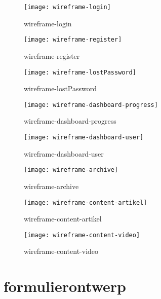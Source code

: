\documentclass[]{report}
\begin{document}
\begin{figure}
	\centering
	\texttt{[image: wireframe-login]}
	\caption{wireframe-login}
	\label{fig:wireframe-login}
\end{figure}


\begin{figure}
	\centering
	\texttt{[image: wireframe-register]}
	\caption{wireframe-register}
	\label{fig:wireframe-register}
\end{figure}

\begin{figure}
	\centering
	\texttt{[image: wireframe-lostPassword]}
	\caption{wireframe-lostPassword}
	\label{fig:wireframe-lostPassword}
\end{figure}


\begin{figure}
	\centering
	\texttt{[image: wireframe-dashboard-progress]}
	\caption{wireframe-dashboard-progress}
	\label{fig:wireframe-dashboard-progress}
\end{figure}

\begin{figure}
	\centering
	\texttt{[image: wireframe-dashboard-user]}
	\caption{wireframe-dashboard-user}
	\label{fig:wireframe-dashboard-user}
\end{figure}

\begin{figure}
	\centering
	\texttt{[image: wireframe-archive]}
	\caption{wireframe-archive}
	\label{fig:wireframe-archive}
\end{figure}

\begin{figure}
	\centering
	\texttt{[image: wireframe-content-artikel]}
	\caption{wireframe-content-artikel}
	\label{fig:wireframe-content-artikel}
\end{figure}

\begin{figure}
	\centering
	\texttt{[image: wireframe-content-video]}
	\caption{wireframe-content-video}
	\label{fig:wireframe-content-video}
\end{figure}









\chapter{formulierontwerp}
\end{document}
